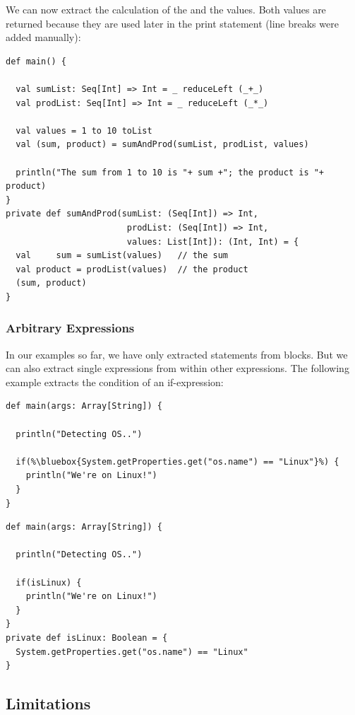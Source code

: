 \documentclass[10pt,a4paper,oneside]{scrreprt}
\begin{document}
We can now extract the calculation of the  and the  values. Both values are returned because they are used later in the print statement (line breaks were added manually):

\begin{lstlisting}
def main() {
  
  val sumList: Seq[Int] => Int = _ reduceLeft (_+_)
  val prodList: Seq[Int] => Int = _ reduceLeft (_*_)
  
  val values = 1 to 10 toList
  val (sum, product) = sumAndProd(sumList, prodList, values)

  println("The sum from 1 to 10 is "+ sum +"; the product is "+ product)
}
private def sumAndProd(sumList: (Seq[Int]) => Int, 
                        prodList: (Seq[Int]) => Int, 
                        values: List[Int]): (Int, Int) = {
  val     sum = sumList(values)   // the sum
  val product = prodList(values)  // the product
  (sum, product)
}
\end{lstlisting}

\subsubsection{Arbitrary Expressions}

In our examples so far, we have only extracted statements from blocks. But we can also extract single expressions from within other expressions. The following example extracts the condition of an if-expression:

\begin{lstlisting}
def main(args: Array[String]) {

  println("Detecting OS..")
  
  if(%\bluebox{System.getProperties.get("os.name") == "Linux"}%) {
    println("We're on Linux!")
  }
}
\end{lstlisting}
\begin{lstlisting}
def main(args: Array[String]) {

  println("Detecting OS..")
  
  if(isLinux) {
    println("We're on Linux!")
  }
}
private def isLinux: Boolean = {
  System.getProperties.get("os.name") == "Linux"
}
\end{lstlisting}

\subsection{Limitations}
\end{document}
